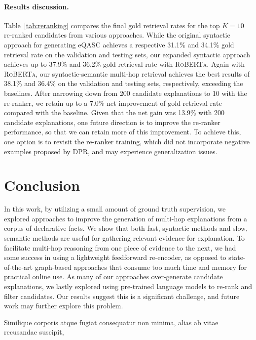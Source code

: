 \documentclass[letterpaper]{article} %
\begin{document}

\paragraph{Results discussion.}
Table~\ref{tab:reranking} compares the final gold retrieval rates for the top $K=10$ re-ranked candidates from various approaches. While the original syntactic approach for generating eQASC achieves a respective 31.1\% and 34.1\%
gold retrieval rate on the validation and testing sets, our expanded syntactic approach achieves up to 37.9\% and 36.2\% gold retrieval rate with \textsc{RoBERTa}. Again with \textsc{RoBERTa}, our syntactic-semantic multi-hop retrieval achieves the best results of 38.1\% and 36.4\% on the validation and testing sets, respectively, exceeding the baselines.
After narrowing down from 200 candidate explanations to 10 with the re-ranker, we retain up to a 7.0\% net improvement of gold retrieval rate compared with the baseline. Given that the net gain was 13.9\% with 200 candidate explanations, one future direction is to improve the re-ranker performance, so that we can retain more of this improvement.
To achieve this, one option is to revisit the re-ranker training, which did not incorporate negative examples proposed by DPR, and may experience generalization issues.




\section{Conclusion}
In this work, by utilizing a small amount of ground truth supervision, we explored approaches to improve the generation of multi-hop explanations from a corpus of declarative facts. We show that both fast, syntactic methods and slow, semantic methods are useful for gathering relevant evidence for explanation.
To facilitate multi-hop reasoning from one piece of evidence to the next, we had some success in using a lightweight feedforward re-encoder, as opposed to state-of-the-art graph-based approaches that consume too much time and memory for practical online use.
As many of our approaches over-generate candidate explanations, we lastly explored using pre-trained language models to re-rank and filter candidates. Our results suggest this is a significant challenge, and future work may further explore this problem.


Similique corporis atque fugiat consequatur non minima, alias ab vitae recusandae suscipit,

\end{document}
